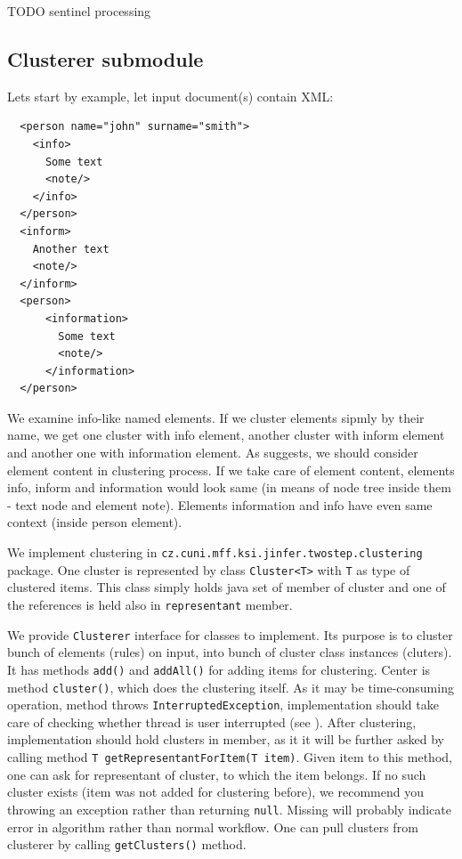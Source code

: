 \documentclass[a4paper,10pt,oneside]{article}
\newcommand{\code}[1]{\texttt{#1}}
\begin{document}
TODO sentinel processing

\subsection{Clusterer submodule}
Lets start by example, let input document(s) contain XML:
\begin{verbatim}
  <person name="john" surname="smith">
    <info>
      Some text
      <note/>
    </info>
  </person>
  <inform>
    Another text
    <note/>
  </inform>
  <person>
      <information>
        Some text
        <note/>
      </information>
  </person>
\end{verbatim}
We examine info-like named elements.
If we cluster elements sipmly by their name, we get one cluster with info element, another cluster with inform element and another one with information element.
As \cite{1802522} suggests, we should consider element content in clustering process.
If we take care of element content, elements info, inform and information would look same (in means of node tree inside them - text node and element note).
Elements information and info have even same context (inside person element).

We implement clustering in \code{cz.cuni.mff.ksi.jinfer.twostep.clustering} package.
One cluster is represented by class \code{Cluster<T>} with \code{T} as type of clustered items.
This class simply holds java set of member of cluster and one of the references is held also in \code{representant} member.

We provide \code{Clusterer} interface for classes to implement.
Its purpose is to cluster bunch of elements (rules) on input, into  bunch of cluster class instances  (cluters).
It has methods \code{add()} and \code{addAll()} for adding items for clustering.
Center is method \code{cluster()}, which does the clustering itself.
As it may be time-consuming operation, method throws \code{InterruptedException}, implementation should take care 
of checking whether thread is user interrupted (see \cite{arch}).
After clustering, implementation should hold clusters in member, as it it will be further asked by calling method \code{T getRepresentantForItem(T item)}.
Given item to this method, one can ask for representant of cluster, to which the item belongs.
If no such cluster exists (item was not added for clustering before), we recommend you throwing an exception rather than returning \code{null}.
Missing will probably  indicate error in algorithm rather than normal workflow.
One can pull clusters from clusterer by calling \code{getClusters()} method.
\end{document}
